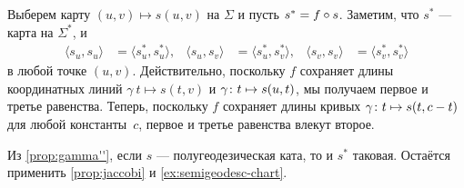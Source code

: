 Выберем карту $(u,v)\mapsto s(u,v)$ на $\Sigma$ и пусть
$s^{*}\z=f\circ s$.
Заметим, что $s^{*}$ --- карта на $\Sigma^{*}$, и 
\begin{align*}
\langle s_u,s_u\rangle
&=
\langle s_u^{*}, s_u^{*}\rangle,
&
\langle s_u, s_v\rangle
&=
\langle s_u^{*}, s_v^{*}\rangle,
&
\langle s_v, s_v\rangle
&=
\langle s_v^{*}, s_v^{*}\rangle
\end{align*}
в любой точке $(u,v)$.
Действительно, поскольку $f$ сохраняет длины координатных линий $\gamma\:t\mapsto s(t,v)$ и  $\gamma\:t\z\mapsto s(u,t)$, мы получаем первое и третье равенства.
Теперь, поскольку $f$ сохраняет длины кривых $\gamma\:t\z\mapsto s(t,c-t)$ для любой константы~$c$, первое и третье равенства влекут второе.

Из \ref{prop:gamma''}, если $s$ --- полугеодезическая ката, то и $s^{*}$ таковая.
Остаётся применить \ref{prop:jaccobi} и \ref{ex:semigeodesc-chart}.
\qeds

